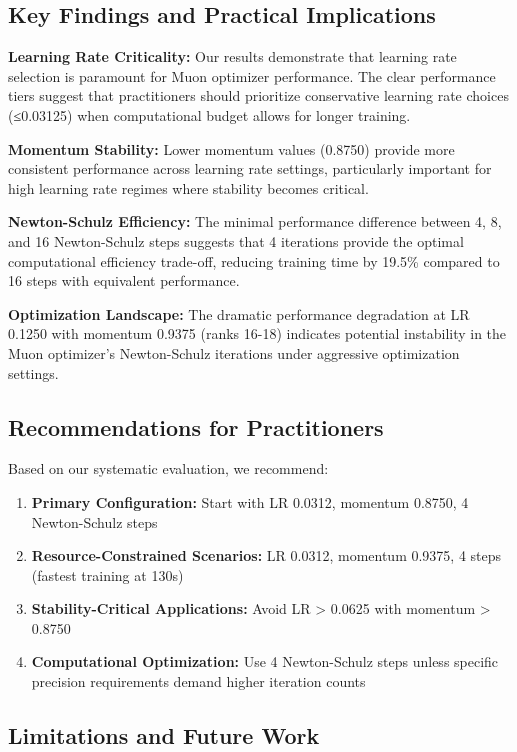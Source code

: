 \documentclass[11pt,a4paper]{article}
\begin{document}
\subsection{Key Findings and Practical Implications}

\textbf{Learning Rate Criticality:} Our results demonstrate that learning rate selection is paramount for Muon optimizer performance. The clear performance tiers suggest that practitioners should prioritize conservative learning rate choices (≤0.03125) when computational budget allows for longer training.

\textbf{Momentum Stability:} Lower momentum values (0.8750) provide more consistent performance across learning rate settings, particularly important for high learning rate regimes where stability becomes critical.

\textbf{Newton-Schulz Efficiency:} The minimal performance difference between 4, 8, and 16 Newton-Schulz steps suggests that 4 iterations provide the optimal computational efficiency trade-off, reducing training time by 19.5\% compared to 16 steps with equivalent performance.

\textbf{Optimization Landscape:} The dramatic performance degradation at LR 0.1250 with momentum 0.9375 (ranks 16-18) indicates potential instability in the Muon optimizer's Newton-Schulz iterations under aggressive optimization settings.

\subsection{Recommendations for Practitioners}

Based on our systematic evaluation, we recommend:

\begin{enumerate}
    \item \textbf{Primary Configuration:} Start with LR 0.0312, momentum 0.8750, 4 Newton-Schulz steps
    \item \textbf{Resource-Constrained Scenarios:} LR 0.0312, momentum 0.9375, 4 steps (fastest training at 130s)
    \item \textbf{Stability-Critical Applications:} Avoid LR > 0.0625 with momentum > 0.8750
    \item \textbf{Computational Optimization:} Use 4 Newton-Schulz steps unless specific precision requirements demand higher iteration counts
\end{enumerate}

\subsection{Limitations and Future Work}
\end{document}
